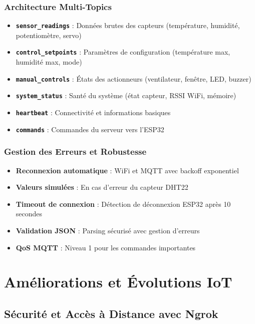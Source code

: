 \documentclass[12pt,a4paper]{article}
\begin{document}
\subsubsection{Architecture Multi-Topics}
\begin{itemize}
    \item \textbf{\texttt{sensor\_readings}} : Données brutes des capteurs (température, humidité, potentiomètre, servo)
    \item \textbf{\texttt{control\_setpoints}} : Paramètres de configuration (température max, humidité max, mode)
    \item \textbf{\texttt{manual\_controls}} : États des actionneurs (ventilateur, fenêtre, LED, buzzer)
    \item \textbf{\texttt{system\_status}} : Santé du système (état capteur, RSSI WiFi, mémoire)
    \item \textbf{\texttt{heartbeat}} : Connectivité et informations basiques
    \item \textbf{\texttt{commands}} : Commandes du serveur vers l'ESP32
\end{itemize}

\subsubsection{Gestion des Erreurs et Robustesse}
\begin{itemize}
    \item \textbf{Reconnexion automatique} : WiFi et MQTT avec backoff exponentiel
    \item \textbf{Valeurs simulées} : En cas d'erreur du capteur DHT22
    \item \textbf{Timeout de connexion} : Détection de déconnexion ESP32 après 10 secondes
    \item \textbf{Validation JSON} : Parsing sécurisé avec gestion d'erreurs
    \item \textbf{QoS MQTT} : Niveau 1 pour les commandes importantes
\end{itemize}

\newpage

\section{Améliorations et Évolutions IoT}

\subsection{Sécurité et Accès à Distance avec Ngrok}
\end{document}
